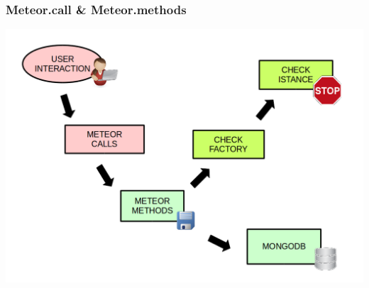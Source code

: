 \begin{frame}
  \frametitle{Meteor.call \& Meteor.methods }
  \begin{center}
    \includegraphics[scale=0.28]{img/5methods.png}
  \end{center}
\end{frame}
